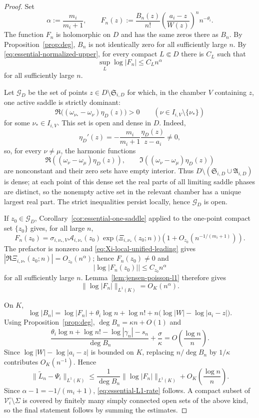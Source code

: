 \documentclass[reqno]{article}
\theoremstyle{definition}
\theoremstyle{remark}
\theoremstyle{plain}
\begin{document}
\begin{proof}
Set
$$\alpha:=\frac{m_i}{m_i+1},\qquad
F_n(z):=\frac{B_n(z)}{n!}\left(\frac{a_i-z}{W(z)}\right)^n n^{-\theta_i}.$$
The function $F_n$ is holomorphic on $D$ and has the same zeros there as $B_n$. By Proposition~\ref{prop:deg}, $B_n$ is not identically zero for all sufficiently large $n$. By \eqref{eq:essential-normalized-upper}, for every compact $L\Subset D$ there is $C_L$ such that
$$\sup_L\log|F_n|\le C_L n^\alpha$$
for all sufficiently large $n$.

Let $\mathcal G_D$ be the set of points $z\in D\setminus\mathfrak S_{i,D}$ for which, in the chamber $V$ containing $z$, one active saddle is strictly dominant:
$$\Re\bigl((\omega_{\nu_\ast}-\omega_\nu)\eta_D(z)\bigr)>0
\qquad(\nu\in I_{i,V}\setminus\{\nu_\ast\})$$
for some $\nu_\ast\in I_{i,V}$. This set is open and dense in $D$. Indeed,
$$\eta_D'(z)=-\frac{m_i}{m_i+1}\frac{\eta_D(z)}{z-a_i}\ne0,$$
so, for every $\nu\ne\mu$, the harmonic functions
$$\Re((\omega_\nu-\omega_\mu)\eta_D(z)),\qquad
\Im((\omega_\nu-\omega_\mu)\eta_D(z))$$
are nonconstant and their zero sets have empty interior. Thus $D\setminus(\mathfrak S_{i,D}\cup\mathfrak A_{i,D})$ is dense; at each point of this dense set the real parts of all limiting saddle phases are distinct, so the nonempty active set in the relevant chamber has a unique largest real part. The strict inequalities persist locally, hence $\mathcal G_D$ is open.

If $z_0\in\mathcal G_D$, Corollary~\ref{cor:essential-one-saddle} applied to the one-point compact set $\{z_0\}$ gives, for all large $n$,
$$F_n(z_0)=\sigma_{i,\nu_\ast,V}\mathcal A_{i,\nu_\ast}(z_0)
\exp\!\bigl(\Xi_{i,\nu_\ast}(z_0;n)\bigr)
\left(1+O_{z_0}\!\left(n^{-1/(m_i+1)}\right)\right).$$
The prefactor is nonzero and \eqref{eq:Xi-local-unified-leading} gives $|\Re\Xi_{i,\nu_\ast}(z_0;n)|=O_{z_0}(n^\alpha)$; hence $F_n(z_0)\ne0$ and
$$|\log|F_n(z_0)||\le C_{z_0}n^\alpha$$
for all sufficiently large $n$. Lemma~\ref{lem:jensen-poisson-l1} therefore gives
$$\|\log|F_n|\|_{L^1(K)}=O_K(n^\alpha).$$

On $K$,
$$\log|B_n|=\log|F_n|+\theta_i\log n+\log n!+n\bigl(\log|W|-\log|a_i-z|\bigr).$$
Using Proposition~\ref{prop:deg}, $\deg B_n=\kappa n+O(1)$ and
$$\frac{\theta_i\log n+\log n!-\log|\gamma_n|-s_n}{\deg B_n}+\frac{\sigma}{\kappa}
=O\!\left(\frac{\log n}{n}\right).$$
Since $\log|W|-\log|a_i-z|$ is bounded on $K$, replacing $n/\deg B_n$ by $1/\kappa$ contributes $O_K(n^{-1})$. Hence
$$
\bigl\|\widetilde L_n-\Psi_i\bigr\|_{L^1(K)}
\le\frac{1}{\deg B_n}\|\log|F_n|\|_{L^1(K)}+O_K\!\left(\frac{\log n}{n}\right).
$$
Since $\alpha-1=-1/(m_i+1)$, \eqref{eq:essential-L1-rate} follows. A compact subset of $\mathcal V_i^\circ\setminus\Sigma$ is covered by finitely many simply connected open sets of the above kind, so the final statement follows by summing the estimates.
\end{proof}
\end{document}

